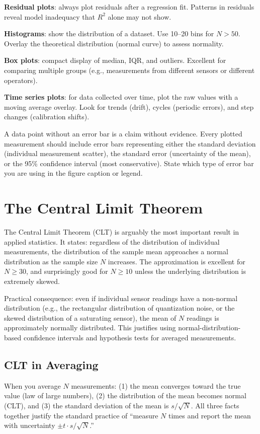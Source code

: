 \documentclass[11pt,letterpaper,twoside,openany]{book}
\begin{document}
\textbf{Residual plots}: always plot residuals after a regression fit. Patterns in residuals reveal model inadequacy that $R^2$ alone may not show.

\textbf{Histograms}: show the distribution of a dataset. Use 10--20 bins for $N > 50$. Overlay the theoretical distribution (normal curve) to assess normality.

\textbf{Box plots}: compact display of median, IQR, and outliers. Excellent for comparing multiple groups (e.g., measurements from different sensors or different operators).

\textbf{Time series plots}: for data collected over time, plot the raw values with a moving average overlay. Look for trends (drift), cycles (periodic errors), and step changes (calibration shifts).

\begin{warningbox}
A data point without an error bar is a claim without evidence. Every plotted measurement should include error bars representing either the standard deviation (individual measurement scatter), the standard error (uncertainty of the mean), or the 95\% confidence interval (most conservative). State which type of error bar you are using in the figure caption or legend.
\end{warningbox}

\section{The Central Limit Theorem}
The Central Limit Theorem (CLT) is arguably the most important result in applied statistics. It states: regardless of the distribution of individual measurements, the distribution of the sample mean approaches a normal distribution as the sample size $N$ increases. The approximation is excellent for $N \geq 30$, and surprisingly good for $N \geq 10$ unless the underlying distribution is extremely skewed.

Practical consequence: even if individual sensor readings have a non-normal distribution (e.g., the rectangular distribution of quantization noise, or the skewed distribution of a saturating sensor), the mean of $N$ readings is approximately normally distributed. This justifies using normal-distribution-based confidence intervals and hypothesis tests for averaged measurements.

\subsection{CLT in Averaging}
When you average $N$ measurements: (1) the mean converges toward the true value (law of large numbers), (2) the distribution of the mean becomes normal (CLT), and (3) the standard deviation of the mean is $s/\sqrt{N}$. All three facts together justify the standard practice of ``measure $N$ times and report the mean with uncertainty $\pm t \cdot s/\sqrt{N}$.''
\end{document}
